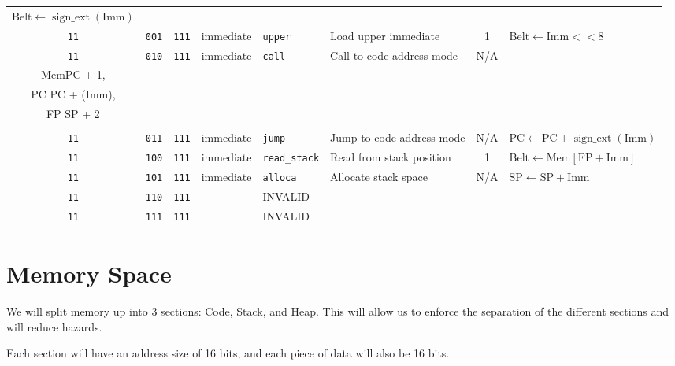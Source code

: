 \documentclass{article}
\begin{document}
\begin{landscape}
\begin{longtable}{c c c c l l c l}
			\(\textrm{Belt} \gets \operatorname{sign\_ext}\left(\textrm{Imm}\right)\) \\
		\texttt{11} & \texttt{001} & \texttt{111} & immediate & \texttt{upper}       & Load upper immediate      & 1   &
			\(\textrm{Belt} \gets \textrm{Imm} << 8\) \\
		\texttt{11} & \texttt{010} & \texttt{111} & immediate & \texttt{call}        & Call to code address mode & N/A &
			\(\begin{array}{l}
				\textrm{Mem}\left[\textrm{SP}\right] \gets \textrm{FP}, \\
				\textrm{Mem}\left[\textrm{SP} + 1\right] \gets \textrm{PC} + 1, \\
				\textrm{PC} \gets \textrm{PC} + \operatorname{sign\_ext}\left(\textrm{Imm}\right), \\
				\textrm{FP} \gets \textrm{SP} + 2 \\
			\end{array}\) \\
		\texttt{11} & \texttt{011} & \texttt{111} & immediate & \texttt{jump}        & Jump to code address mode & N/A &
			\(\textrm{PC} \gets \textrm{PC} + \operatorname{sign\_ext}\left(\textrm{Imm}\right)\) \\
		\texttt{11} & \texttt{100} & \texttt{111} & immediate & \texttt{read\_stack} & Read from stack position  & 1   &
			\(\textrm{Belt} \gets \textrm{Mem}\left[\textrm{FP} + \textrm{Imm}\right]\) \\
		\texttt{11} & \texttt{101} & \texttt{111} & immediate & \texttt{alloca}      & Allocate stack space      & N/A &
			\(\textrm{SP} \gets \textrm{SP} + \textrm{Imm}\) \\
		\texttt{11} & \texttt{110} & \texttt{111} & & INVALID & \\
		\texttt{11} & \texttt{111} & \texttt{111} & & INVALID & \\
	\end{longtable}
\end{landscape}

\section{Memory Space}

	We will split memory up into 3 sections: Code, Stack, and Heap.
	This will allow us to enforce the separation of the different sections and will reduce hazards.

	Each section will have an address size of 16 bits, and each piece of data will also be 16 bits.
\end{document}

